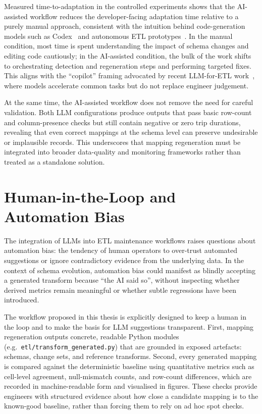 Measured time-to-adaptation in the controlled experiments shows that the AI-assisted workflow reduces the developer-facing adaptation time relative to a purely manual approach, consistent with the intuition behind code-generation models such as Codex~\cite{chen2021evaluating} and autonomous ETL prototypes~\cite{diprofio2025flowetl}. In the manual condition, most time is spent understanding the impact of schema changes and editing code cautiously; in the AI-assisted condition, the bulk of the work shifts to orchestrating detection and regeneration steps and performing targeted fixes. This aligns with the “copilot” framing advocated by recent LLM-for-ETL work~\cite{narayan2022foundation}, where models accelerate common tasks but do not replace engineer judgement.

At the same time, the AI-assisted workflow does not remove the need for careful validation. Both LLM configurations produce outputs that pass basic row-count and column-presence checks but still contain negative or zero trip durations, revealing that even correct mappings at the schema level can preserve undesirable or implausible records. This underscores that mapping regeneration must be integrated into broader data-quality and monitoring frameworks rather than treated as a standalone solution.


\section{Human-in-the-Loop and Automation Bias}
\label{sec:discussion-human-loop}

The integration of LLMs into ETL maintenance workflows raises questions about automation bias: the
tendency of human operators to over-trust automated suggestions or ignore contradictory evidence
from the underlying data. In the context of schema evolution, automation bias could manifest as
blindly accepting a generated transform because ``the AI said so'', without inspecting whether
derived metrics remain meaningful or whether subtle regressions have been introduced.

The workflow proposed in this thesis is explicitly designed to keep a human in the loop and to make
the basis for LLM suggestions transparent. First, mapping regeneration outputs concrete, readable
Python modules (e.g.\ \texttt{etl/transform\_generated.py}) that are grounded in exposed artefacts:
schemas, change sets, and reference transforms. Second, every generated mapping is compared against
the deterministic baseline using quantitative metrics such as cell-level agreement, null-mismatch
counts, and row-count differences, which are recorded in machine-readable form and visualised in
figures. These checks provide engineers with structured evidence about how close a candidate
mapping is to the known-good baseline, rather than forcing them to rely on ad hoc spot checks.

